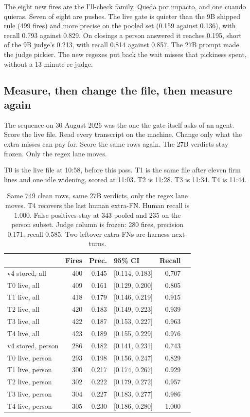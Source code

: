 The eight new fires are the I'll-check family, Queda por impacto,
and one cuando quieras. Seven of eight are pushes. The live gate
is quieter than the 9B shipped rule (499 fires) and more precise
on the pooled set (0.159 against 0.136), with recall 0.793 against
0.829. On closings a person answered it reaches 0.195, short of
the 9B judge's 0.213, with recall 0.814 against 0.857. The 27B
prompt made the judge pickier. The new regexes put back the wait
misses that pickiness spent, without a 13-minute re-judge.

\subsection{Measure, then change the file, then measure again}
\label{sec:t0t1}

The sequence on 30 August 2026 was the one the gate itself asks of
an agent. Score the live file. Read every transcript on the machine.
Change only what the extra misses can pay for. Score the same rows
again. The 27B verdicts stay frozen. Only the regex lane moves.

T0 is the live file at 10:58, before this pass. T1 is the same file
after eleven firm lines and one idle widening, scored at 11:03.
T2 is 11:28. T3 is 11:34. T4 is 11:44.

\begin{table}[ht]
\centering
{\small\begin{tabular}{lrrlrr}
\toprule
 & Fires & Prec. & 95\% CI & Recall \\
\midrule
v4 stored, all & 400 & 0.145 & [0.114, 0.183] & 0.707 \\
T0 live, all & 409 & 0.161 & [0.129, 0.200] & 0.805 \\
T1 live, all & 418 & 0.179 & [0.146, 0.219] & 0.915 \\
T2 live, all & 420 & 0.183 & [0.149, 0.223] & 0.939 \\
T3 live, all & 422 & 0.187 & [0.153, 0.227] & 0.963 \\
T4 live, all & 423 & 0.189 & [0.155, 0.229] & 0.976 \\
\midrule
v4 stored, person & 286 & 0.182 & [0.141, 0.231] & 0.743 \\
T0 live, person & 293 & 0.198 & [0.156, 0.247] & 0.829 \\
T1 live, person & 300 & 0.217 & [0.174, 0.267] & 0.929 \\
T2 live, person & 302 & 0.222 & [0.179, 0.272] & 0.957 \\
T3 live, person & 304 & 0.227 & [0.183, 0.277] & 0.986 \\
T4 live, person & 305 & 0.230 & [0.186, 0.280] & 1.000 \\
\bottomrule
\end{tabular}}
\caption{Same 749 clean rows, same 27B verdicts, only the regex lane
moves. T4 recovers the last human extra-FN. Human recall is 1.000. False
positives stay at 343 pooled and 235 on the person subset. Judge column
is frozen: 280 fires, precision 0.171, recall 0.585. Two leftover extra-FNs
are harness next-turns.}
\label{tab:t0t1}
\end{table}

